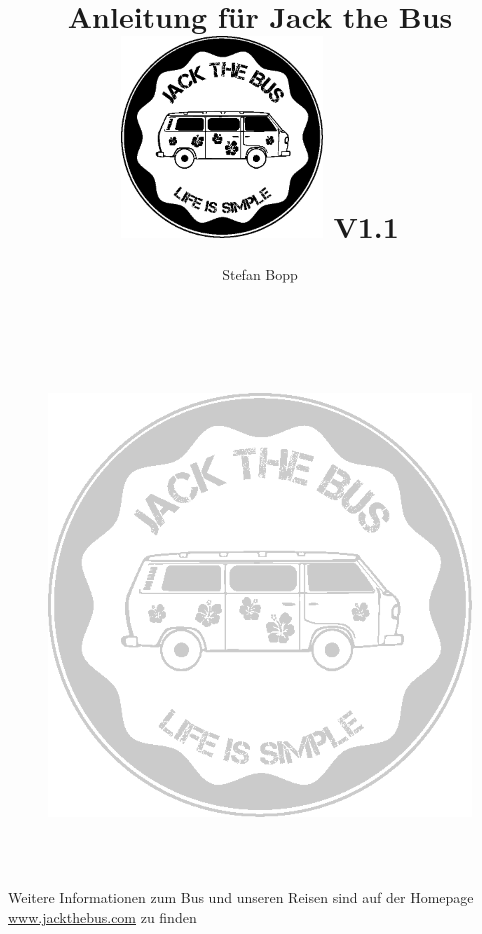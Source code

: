 \documentclass[10pt,nswissgerman,]{article}
\begin{document}
\author{Stefan Bopp}
\title{\Huge Anleitung für Jack the Bus\vspace{2cm}
\includegraphics[width=0.4\textwidth]{../Bilder/Logo/Logo.png}
\centering
\vfill
{\large V1.1}
}
\maketitle
\vfill
{}
\cfoot{\thepage}
\newpage
\tableofcontents

\newpage


\newpage
\listoffigures
\newpage
\begin{figure}[H]
    \centering
    \includegraphics[width=\textwidth,height=14cm, keepaspectratio]{../Bilder/Logo/Logo_trans.png}
    \label{img:Logo}
\end{figure}
\vfill
    \begin{center}
        {\huge  Weitere Informationen zum Bus und unseren Reisen sind auf der Homepage {\url{www.jackthebus.com}} zu finden}
\end{center}
\end{document}
